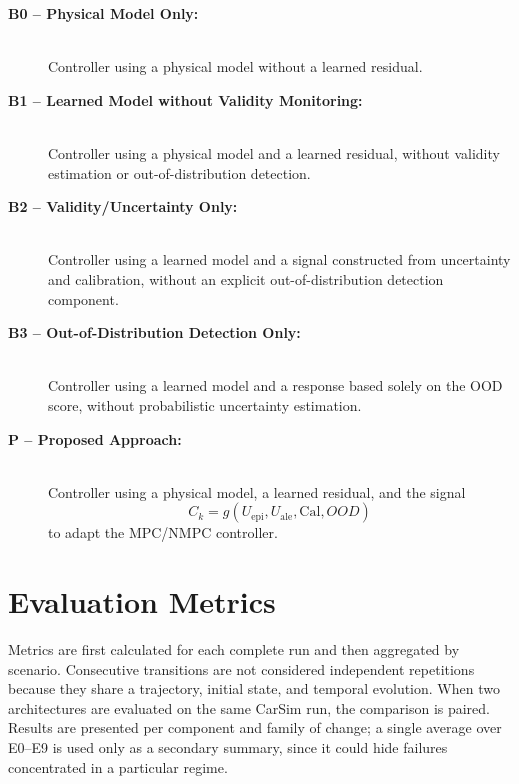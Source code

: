\documentclass[12pt,a4paper]{report}
\begin{document}

\begin{description}
    \item[\textbf{B0 -- Physical Model Only:}]\hfill\\
    Controller using a physical model without a learned residual.

    \item[\textbf{B1 -- Learned Model without Validity Monitoring:}]\hfill\\
    Controller using a physical model and a learned residual, without validity estimation or out-of-distribution detection.

    \item[\textbf{B2 -- Validity/Uncertainty Only:}]\hfill\\
    Controller using a learned model and a signal constructed from uncertainty and calibration, without an explicit out-of-distribution detection component.

    \item[\textbf{B3 -- Out-of-Distribution Detection Only:}]\hfill\\
    Controller using a learned model and a response based solely on the OOD score, without probabilistic uncertainty estimation.

    \item[\textbf{P -- Proposed Approach:}]\hfill\\
    Controller using a physical model, a learned residual, and the signal
    \[
        C_k=g(U_{\mathrm{epi}},U_{\mathrm{ale}},\mathrm{Cal},OOD)
    \]
    to adapt the MPC/NMPC controller.
\end{description}


\section{Evaluation Metrics}
\label{sec:metricas_evaluacion}

Metrics are first calculated for each complete run and then aggregated by scenario. Consecutive transitions are not considered independent repetitions because they share a trajectory, initial state, and temporal evolution. When two architectures are evaluated on the same CarSim run, the comparison is paired. Results are presented per component and family of change; a single average over E0--E9 is used only as a secondary summary, since it could hide failures concentrated in a particular regime.
\end{document}

